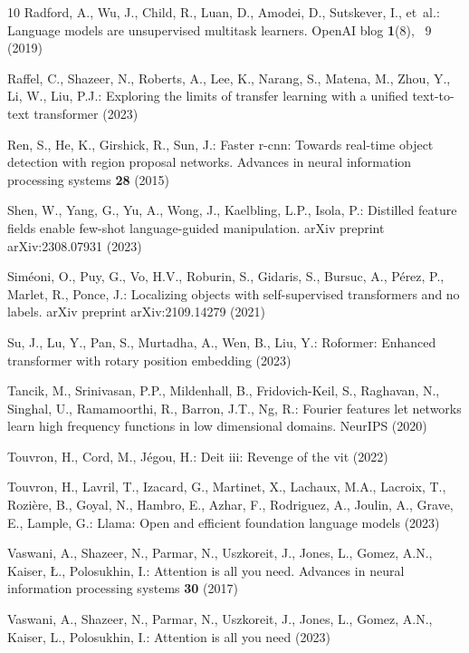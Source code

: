 \documentclass[runningheads]{llncs}
\begin{document}
\begin{thebibliography}{10}
Radford, A., Wu, J., Child, R., Luan, D., Amodei, D., Sutskever, I., et~al.: Language models are unsupervised multitask learners. OpenAI blog  \textbf{1}(8), ~9 (2019)

Raffel, C., Shazeer, N., Roberts, A., Lee, K., Narang, S., Matena, M., Zhou, Y., Li, W., Liu, P.J.: Exploring the limits of transfer learning with a unified text-to-text transformer (2023)

Ren, S., He, K., Girshick, R., Sun, J.: Faster r-cnn: Towards real-time object detection with region proposal networks. Advances in neural information processing systems  \textbf{28} (2015)

Shen, W., Yang, G., Yu, A., Wong, J., Kaelbling, L.P., Isola, P.: Distilled feature fields enable few-shot language-guided manipulation. arXiv preprint arXiv:2308.07931  (2023)

Sim{\'e}oni, O., Puy, G., Vo, H.V., Roburin, S., Gidaris, S., Bursuc, A., P{\'e}rez, P., Marlet, R., Ponce, J.: Localizing objects with self-supervised transformers and no labels. arXiv preprint arXiv:2109.14279  (2021)

Su, J., Lu, Y., Pan, S., Murtadha, A., Wen, B., Liu, Y.: Roformer: Enhanced transformer with rotary position embedding (2023)

Tancik, M., Srinivasan, P.P., Mildenhall, B., Fridovich-Keil, S., Raghavan, N., Singhal, U., Ramamoorthi, R., Barron, J.T., Ng, R.: Fourier features let networks learn high frequency functions in low dimensional domains. NeurIPS  (2020)

Touvron, H., Cord, M., Jégou, H.: Deit iii: Revenge of the vit (2022)

Touvron, H., Lavril, T., Izacard, G., Martinet, X., Lachaux, M.A., Lacroix, T., Rozière, B., Goyal, N., Hambro, E., Azhar, F., Rodriguez, A., Joulin, A., Grave, E., Lample, G.: Llama: Open and efficient foundation language models (2023)

Vaswani, A., Shazeer, N., Parmar, N., Uszkoreit, J., Jones, L., Gomez, A.N., Kaiser, {\L}., Polosukhin, I.: Attention is all you need. Advances in neural information processing systems  \textbf{30} (2017)

Vaswani, A., Shazeer, N., Parmar, N., Uszkoreit, J., Jones, L., Gomez, A.N., Kaiser, L., Polosukhin, I.: Attention is all you need (2023)


\end{thebibliography}
\end{document}
